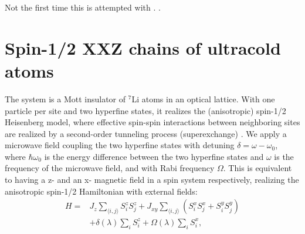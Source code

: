 Not the first time this is attempted with . \cite{sun_optimizing_2022}.

\section{Spin-1/2 XXZ chains of ultracold atoms}

The system is a Mott insulator of $^7$Li atoms in an optical lattice. With one particle per site and two hyperfine states, it realizes the (anisotropic) spin-1/2 Heisenberg model, where effective spin-spin interactions between neighboring sites are realized by a second-order tunneling process (superexchange) \cite{altman03, ddl03}. We apply a microwave field coupling the two hyperfine states with detuning $\delta = \omega - \omega_0$, where $\hbar \omega_0$ is the energy difference between the two hyperfine states and $\omega$ is the frequency of the microwave field, and with Rabi frequency $\Omega$. This is equivalent to having a z- and an x- magnetic field in a spin system respectively, realizing the anisotropic spin-1/2 Hamiltonian with external fields:
\begin{align}
H = & J_z \sum_{\langle i,j \rangle} S_i^zS_j^z+ J_{xy} \sum_{\langle i,j \rangle}  \left(S_i^xS_j^x + S_i^yS_j^y \right) \nonumber \\
& + \delta(\lambda) \sum_i S_i^z + \Omega(\lambda) \sum_i S_i^x,
\label{Heisenberg}
\end{align}